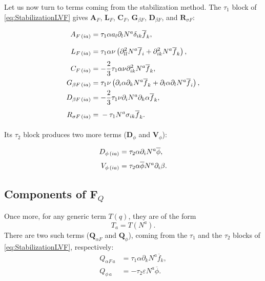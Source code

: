 Let us now turn to terms coming from the stabilization method. The $\tau_1$ block of \cref{eq:StabilizationLVF} gives $\mathbf{A}_F$, $\mathbf{L}_F$, $\mathbf{C}_F$, $\mathbf{G}_{\beta F}$, $\mathbf{D}_{\beta F}$, and $\mathbf{R}_{\sigma F}$:
\renewcommand{\VertSpace}{\vphantom{\frac{2}{3}}}
\begin{align}
  A_{F\, (ia)}        & = \VertSpace\tau_1 \alpha a_l \partial_l N^a \delta_{ik} \overline{f}_k, \label{eq:AFTerm}                                            \\
  L_{F\, (ia)}        & = \VertSpace\tau_1 \alpha \nu \left(\partial^2_{ll} N^a \overline{f}_i + \partial^2_{ik} N^a \overline{f}_k\right), \label{eq:LFTerm} \\
  C_{F\, (ia)}        & = - \frac{2}{3} \tau_1 \alpha \nu \partial^2_{ik} N^a \overline{f}_k, \label{eq:CFTerm}                                               \\
  G_{\beta F\, (ia)}  & = \tau_1 \nu \left( \partial_i \alpha \partial_k N^a \overline{f}_k + \partial_l \alpha \partial_l N^a \overline{f}_i \right), \label{eq:GBetaFTerm} \\
  D_{\beta F\, (ia)}  & = -\frac{2}{3} \tau_1 \nu \partial_i N^a \partial_k \alpha \overline{f}_k, \label{eq:DBetaFTerm}                                      \\
  R_{\sigma F\, (ia)} & = \VertSpace- \tau_1 N^a \sigma_{ik} \overline{f}_k. \label{eq:RSigmaFTerm}
\end{align}

Its $\tau_2$ block produces two more terms ($\mathbf{D}_{\phi}$ and $\mathbf{V}_{\phi}$):
\begin{align}
  D_{\phi\, (ia)}  & = \VertSpace \tau_2 \alpha \partial_i N^a \overline{\phi}, \label{eq:DPhiTerm} \\
  V_{\phi \, (ia)} & = \tau_2 \alpha \overline{\phi} N^a \partial_i \beta. \label{eq:VPhiTerm}
\end{align}

\subsection{Components of $\mathbf{F}_{Q}$} \label{sec:FQComponents}
Once more, for any generic term $T(q)$, they are of the form
\begin{equation} \label{eq:GenericQFTerm}
  T_{a} = T(N^a).
\end{equation}
There are two such terms ($\mathbf{Q}_{\alpha F}$ and $\mathbf{Q}_{\phi}$), coming from the $\tau_1$ and the $\tau_2$ blocks of \cref{eq:StabilizationLVF}, respectively:
\begin{align}
  Q_{\alpha F\, a} & = \tau_1 \alpha \partial_k N^a \overline{f}_k, \label{eq:QAlphaFTerm} \\
  Q_{\phi \, a} & = - \tau_2 \varepsilon N^a \overline{\phi}. \label{eq:QPhiTerm}
\end{align}

